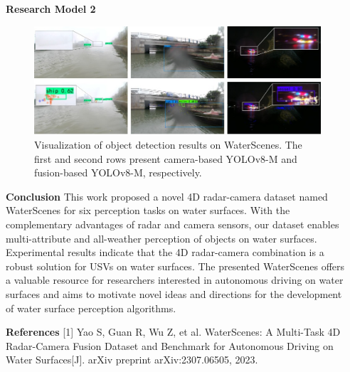 \documentclass[final]{beamer}
\newlength{\sepwidthB}
\newlength{\colwidthB}
\newcommand{\separatorcolumnB}{\begin{column}{\sepwidthB}\end{column}}
\begin{document}
\begin{frame}[t]
\begin{columns}
\begin{column}[T]{\colwidthB}
\begin{block}{\Large{\textbf{Research Model 2}}}
\begin{figure}[htbp]
\centering
\includegraphics[width=0.95\columnwidth]{images/visualization}
\captionsetup{justification=centering} 
\caption{Visualization of object detection results on WaterScenes. The first and second rows present camera-based YOLOv8-M and fusion-based YOLOv8-M, respectively.}
\end{figure}
\end{block}

\vspace{-0.5cm}
\begin{block}{\Large{\textbf{Conclusion}}}
\vspace{0.9cm}
\large
This work proposed a novel 4D radar-camera dataset named WaterScenes for six perception tasks on water surfaces. 
With the complementary advantages of radar and camera sensors, our dataset enables multi-attribute and all-weather perception of objects on water surfaces. 
Experimental results indicate that the 4D radar-camera combination is a robust solution for USVs on water surfaces. 
The presented WaterScenes offers a valuable resource for researchers interested in autonomous driving on water surfaces and aims to motivate novel ideas and directions for the development of water surface perception algorithms. 
\end{block}

\vspace{-0.5cm}
\begin{block}{\large{\textbf{References}}}
\vspace{0.5cm}
\normalsize
[1] Yao S, Guan R, Wu Z, et al. WaterScenes: A Multi-Task 4D Radar-Camera Fusion Dataset and Benchmark for Autonomous Driving on Water Surfaces[J]. arXiv preprint arXiv:2307.06505, 2023.
\end{block}

\end{column}
\separatorcolumnB
\end{columns}
\end{frame}
\end{document}
